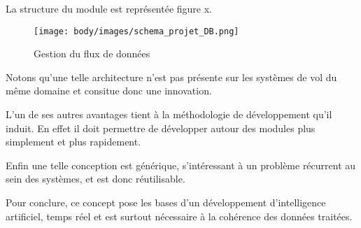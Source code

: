 La structure du module est représentée figure x.

\begin{figure}[H]
    \begin{center}
        \texttt{[image: body/images/schema\_projet\_DB.png]}
    \end{center}
    \caption{Gestion du flux de données}
    \label{fig:fluxData}
\end{figure}


Notons qu'une telle architecture n'est pas présente sur les systèmes de vol
du même domaine et consitue donc une innovation.

L'un de ses autres avantages tient à la méthodologie de développement qu'il
induit. En effet il doit permettre de développer autour des modules plus
simplement et plus rapidement. 

Enfin une telle conception est générique, s'intéressant à un problème
récurrent au sein des systèmes, et est donc réutilisable.\newline

Pour conclure, ce concept pose les bases d'un développement d'intelligence
artificiel, temps réel et est surtout nécessaire à la cohérence des données
traitées.

